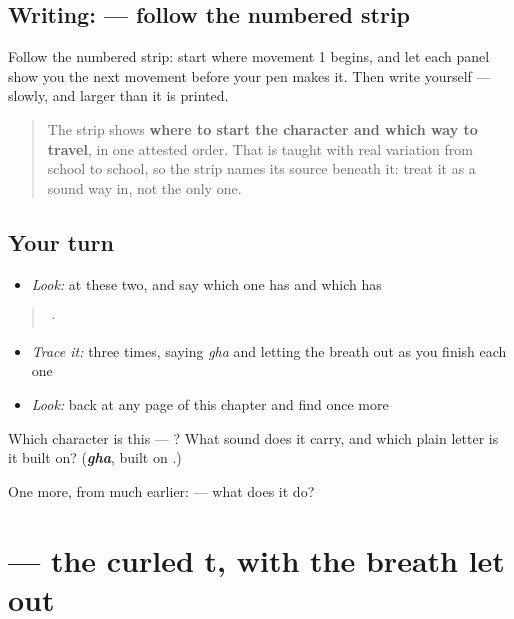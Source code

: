 \subsection*{Writing:  — follow the numbered strip}

Follow the numbered strip: start where movement 1 begins, and let each panel show you the next movement before your pen makes it. Then write  yourself — slowly, and larger than it is printed.

\begin{quote}
The strip shows \textbf{where to start the character and which way to travel}, in one attested order. That is taught with real variation from school to school, so the strip names its source beneath it: treat it as a sound way in, not the only one.
\end{quote}

\subsection*{Your turn}
\begin{itemize}
\raggedright
  \item \emph{Look:} at these two, and say which one has  and which has 
\end{itemize}

\begin{quote}
  ·  
\end{quote}

\begin{itemize}
\raggedright
  \item \emph{Trace it:}  three times, saying \emph{gha} and letting the breath out as you finish each one
  \item \emph{Look:} back at any page of this chapter and find  once more
\end{itemize}

\begin{tcolorbox}[breakable,colback=teal!4,colframe=teal!35!black,title={Before you move on}]
Which character is this — ? What sound does it carry, and which plain letter is it built on? (\emph{\textbf{gha}}, built on .)

One more, from much earlier:  — what does it do?
\end{tcolorbox}
\section[\texorpdfstring{\te{ఠ} (ṭha)}{ఠ (ṭha)}]{ — the curled t, with the breath let out}

